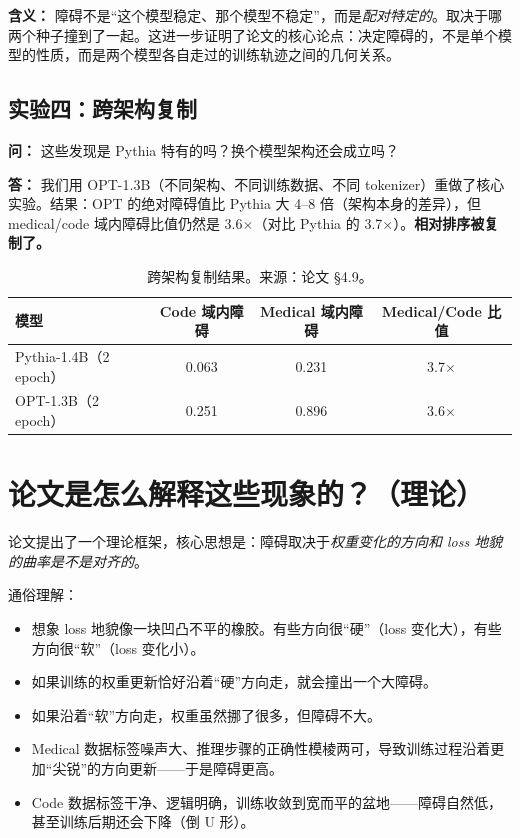 \documentclass[12pt,a4paper]{ctexart}
\begin{document}
\textbf{含义：} 障碍不是``这个模型稳定、那个模型不稳定''，而是\emph{配对特定的}。取决于哪两个种子撞到了一起。这进一步证明了论文的核心论点：决定障碍的，不是单个模型的性质，而是两个模型各自走过的训练轨迹之间的几何关系。

\subsection*{实验四：跨架构复制}

\textbf{问：} 这些发现是 Pythia 特有的吗？换个模型架构还会成立吗？

\textbf{答：} 我们用 OPT-1.3B（不同架构、不同训练数据、不同 tokenizer）重做了核心实验。结果：OPT 的绝对障碍值比 Pythia 大 4--8 倍（架构本身的差异），但 medical/code 域内障碍比值仍然是 3.6$\times$（对比 Pythia 的 3.7$\times$）。\textbf{相对排序被复制了。}

\begin{table}[H]
\centering
\begin{tabular}{lccc}
\toprule
\textbf{模型} & \textbf{Code 域内障碍} & \textbf{Medical 域内障碍} & \textbf{Medical/Code 比值} \\
\midrule
Pythia-1.4B（2 epoch）& 0.063 & 0.231 & 3.7$\times$ \\
OPT-1.3B（2 epoch）& 0.251 & 0.896 & 3.6$\times$ \\
\bottomrule
\end{tabular}
\caption{跨架构复制结果。来源：论文 \S4.9。}
\end{table}

\section{论文是怎么解释这些现象的？（理论）}

论文提出了一个理论框架，核心思想是：障碍取决于\emph{权重变化的方向和 loss 地貌的曲率是不是对齐的}。

通俗理解：
\begin{itemize}
  \item 想象 loss 地貌像一块凹凸不平的橡胶。有些方向很``硬''（loss 变化大），有些方向很``软''（loss 变化小）。
  \item 如果训练的权重更新恰好沿着``硬''方向走，就会撞出一个大障碍。
  \item 如果沿着``软''方向走，权重虽然挪了很多，但障碍不大。
  \item Medical 数据标签噪声大、推理步骤的正确性模棱两可，导致训练过程沿着更加``尖锐''的方向更新——于是障碍更高。
  \item Code 数据标签干净、逻辑明确，训练收敛到宽而平的盆地——障碍自然低，甚至训练后期还会下降（倒 U 形）。
\end{itemize}
\end{document}
